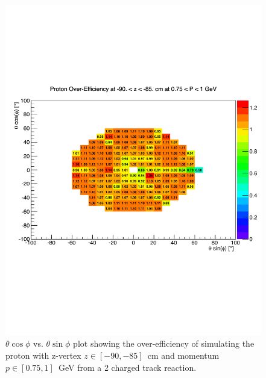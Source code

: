 \begin{figure}[htpb]\begin{center}
\includegraphics[width=1.1 \figwidth,height=\hfigheight]{figures/xsec/Proton_Eff.pdf}
\caption{\label{fig:ProtonEff} $\theta \cos\phi$ vs. $\theta \sin\phi$ plot showing the over-efficiency of simulating the proton with z-vertex $z \in [-90,-85]$~cm and momentum $p \in [0.75,1]$~GeV from a 2 charged track reaction.}
\end{center}\end{figure}

